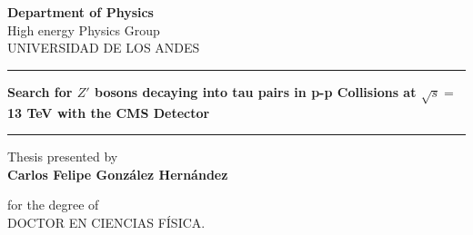 \oddsidemargin 0.4cm \evensidemargin 0.4cm \topmargin 1.0cm
\textwidth 15.7cm \textheight 21.0cm \headsep 1.2cm \footskip 1.0cm

\begin{center}
\textbf{Department of Physics}\\
 High energy Physics Group\\
 \large{UNIVERSIDAD DE LOS ANDES}
\end{center}

\vspace{1.0cm}

\begin{figure}[ht]
\begin{center}
\end{center}
\end{figure}

\vspace{1.0em}

\begin{center} 
\rule{\linewidth}{0.5 mm}
\LARGE{\textbf{Search for $Z'$ bosons decaying into tau pairs in 
p-p Collisions at $\sqrt{s}=$13 TeV with the CMS Detector}}\\
\rule{\linewidth}{0.5 mm} 
\end{center}

\vspace{1.5em}
\begin{center}
\small Thesis presented by\\
\Large \textbf{Carlos Felipe Gonz\'{a}lez Hern\'{a}ndez}
\end{center}

\vspace{1.0em}
\begin{center}
for the degree of\\
DOCTOR EN CIENCIAS FÍSICA.
\vspace{1.5em}
\end{center}

